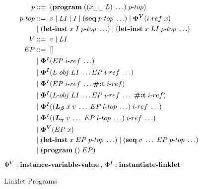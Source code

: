 \documentclass[sigplan,screen,anonymous]{acmart}
\def\dash {\text{-}}
\begin{document}
\begin{figure}[h!]
  \begin{align*}
    p           &::=\; (\textbf{program}\; ((x_{\_!\_}\; L)\; \ldots)\; p\dash top) \\
    p\dash top  &::=\; v\; |\; LI\; |\; I\; |\; (\textbf{seq}\; p\dash top\; \ldots)\; |\; \bm{\Phi^V}(i\dash ref\; x) \\
    \;          &\;|\; (\textbf{let\dash inst}\; x\; I\;p\dash top\; \ldots)\; |\; (\textbf{let\dash inst}\; x\; LI\;p\dash top\; \ldots) \\
    V           &::=\; v\; |\; LI \\
    EP          &::=\; [] \\
    \;          &\;|\; \bm{\Phi^I}(EP\; i\dash ref\; \ldots) \\ %
    \;          &\;|\; \bm{\Phi^I}(L\dash obj\; LI\; \ldots EP\; i\dash ref\; \ldots) \\ %
    \;          &\;|\; \bm{\Phi^I}(EP\; i\dash ref\; \ldots \textbf{\#:t}\; i\dash ref) \\ %
    \;          &\;|\; \bm{\Phi^I}(L\dash obj\; LI\; \ldots EP\; i\dash ref\; \ldots\; \textbf{\#:t}\; i\dash ref) \\ %
    \;          &\;|\; \bm{\Phi^I}((\lb\; x\; v\; \ldots\; EP\; l\dash top\; \ldots)\; i\dash ref\; \ldots) \\
    \;          &\;|\; \bm{\Phi^I}((\lc\; v\; \ldots\; EP\; l\dash top\; \ldots)\; i\dash ref\; \ldots) \\
    \;          &\;|\; \bm{\Phi^V}(EP\; x) \\
    \;          &\;|\; (\textbf{let\dash inst}\; x\; EP\; p\dash top\; \ldots)\; |\; (\textbf{seq}\; v\; \ldots\; EP\; p\dash top\; \ldots) \\
    \;          &\;|\; (\textbf{program}\; ()\; EP) \\
  \end{align*}
  \hfill \footnotesize $\Phi^V : \textbf{instance\dash variable\dash value}\:,\: \Phi^I : \textbf{instantiate\dash linklet}$
\caption{Linklet Programs}
\label{fig:linklet-program}
\end{figure}

\newcommand{\redinput}[1]{EP\;\llbracket #1 \rrbracket, \Omega, \rho, \sigma\;}
\newcommand{\redoutput}[4]{EP\;\llbracket #1 \rrbracket, #2, #3, #4\;}
\def\where {\textbf{where}\;}
\def\rel {&\longrightarrow_{\beta p}\;}
\end{document}

